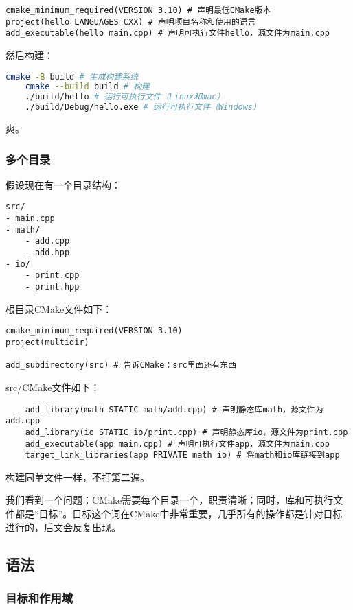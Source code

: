 \documentclass[../main.tex]{subfiles}
\begin{document}
\begin{lstlisting}
cmake_minimum_required(VERSION 3.10) # 声明最低CMake版本
project(hello LANGUAGES CXX) # 声明项目名称和使用的语言
add_executable(hello main.cpp) # 声明可执行文件hello，源文件为main.cpp
\end{lstlisting}

然后构建：
\begin{lstlisting}[language=bash]
    cmake -B build # 生成构建系统
    cmake --build build # 构建
    ./build/hello # 运行可执行文件（Linux和mac）
    ./build/Debug/hello.exe # 运行可执行文件（Windows）
\end{lstlisting}

爽。

\subsubsection{多个目录}

假设现在有一个目录结构：
\begin{lstlisting}
src/
- main.cpp
- math/
    - add.cpp
    - add.hpp
- io/
    - print.cpp
    - print.hpp
\end{lstlisting}

根目录CMake文件如下：
\begin{lstlisting}
cmake_minimum_required(VERSION 3.10)
project(multidir)

add_subdirectory(src) # 告诉CMake：src里面还有东西
\end{lstlisting}

src/CMake文件如下：
\begin{lstlisting}
    add_library(math STATIC math/add.cpp) # 声明静态库math，源文件为add.cpp
    add_library(io STATIC io/print.cpp) # 声明静态库io，源文件为print.cpp
    add_executable(app main.cpp) # 声明可执行文件app，源文件为main.cpp
    target_link_libraries(app PRIVATE math io) # 将math和io库链接到app
\end{lstlisting}

构建同单文件一样，不打第二遍。

我们看到一个问题：CMake需要每个目录一个，职责清晰；同时，库和可执行文件都是“目标”。目标这个词在CMake中非常重要，几乎所有的操作都是针对目标进行的，后文会反复出现。

\subsection{语法}

\subsubsection{目标和作用域}
\end{document}
